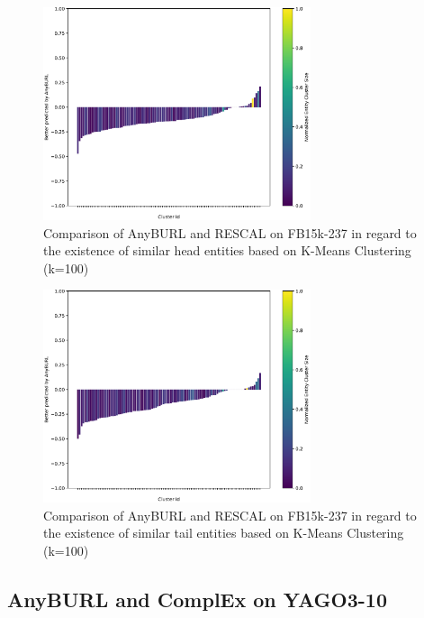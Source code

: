 \begin{figure}[H]
\centering
\includegraphics[width=0.7\textwidth]{images/head_cluster_100_anyburl_rescal_fb15k.PNG}
\caption{Comparison of AnyBURL and RESCAL on FB15k-237 in regard to the existence of similar head entities based on K-Means Clustering (k=100)}
\label{fig:head_cluster_100_anyburl_rescal_fb15k}
\end{figure}

\begin{figure}[H]
\centering
\includegraphics[width=0.7\textwidth]{images/tail_cluster_100_anyburl_rescal_fb15k.PNG}
\caption{Comparison of AnyBURL and RESCAL on FB15k-237 in regard to the existence of similar tail entities based on K-Means Clustering (k=100)}
\label{fig:tail_cluster_100_anyburl_rescal_fb15k}
\end{figure}

\subsection{AnyBURL and ComplEx on YAGO3-10}

